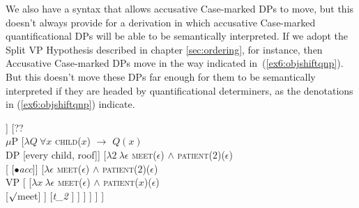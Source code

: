 We also have a syntax that allows accusative Case-marked DPs to move, but this doesn't always provide for a derivation in which accusative Case-marked quantificational DPs will be able to be semantically interpreted. If we adopt the Split VP Hypothesis described in chapter \ref{sec:ordering}, for instance, then Accusative Case-marked DPs move in the way indicated in~(\ref{ex6:objshiftqnp}). But this doesn't move these DPs far enough for them to be semantically interpreted if they are headed by quantificational determiners, as the denotations in (\ref{ex6:objshiftqnp}) indicate.%
%
%
%
\medskip
\begin{fullwidth}
\begin{exe}
\raggedright
	\ex \label{ex6:objshiftqnp}
	\begin{xlist}
		\ex 
		\footnotesize
		\begin{forest}
		[\ibar{v}
			[\obar{v} [agent] ]
			[??\\$\mu$P
				[$\lambda Q\ \forall x$ \textsc{child}($x$) $\rightarrow$ $Q(x)$ \\DP [every child, roof]]
				[$\lambda 2\ \lambda \epsilon$ \textsc{meet}($\epsilon$) $\wedge$ \textsc{patient}($2$)($\epsilon$)\\\ibar{$\mu$} 
					[\obar{$\mu$} [$\bullet$\emph{acc}]]
					[$\lambda \epsilon$ \textsc{meet}($\epsilon$) $\wedge$ \textsc{patient}($2$)($\epsilon$)\\VP [
						[$\lambda x\ \lambda \epsilon$ \textsc{meet}($\epsilon$) $\wedge$ \textsc{patient}($x$)($\epsilon$)\\ [$\surd$meet] ]
						[\emph{t_2} ]
					] ]
				 ]
			]
		]
		\end{forest}


\end{xlist}
\end{exe}
\end{fullwidth}
